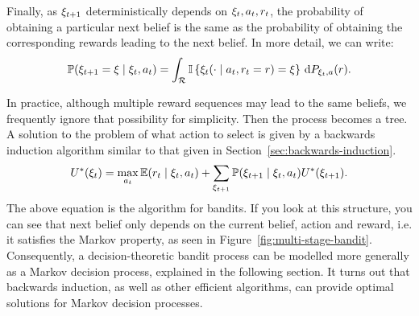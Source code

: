 \begin{definition}
  Finally, as $\xi_{t+1}$ deterministically depends on $\xi_t, a_t, r_t$, the probability of obtaining a particular next belief is the same as the probability of obtaining the corresponding rewards leading to the next belief. In more detail, we can write:
  \begin{equation}
    \label{eq:dt-bandit-belief-probability}
    \mathop{\mbox{\ensuremath{\mathbb{P}}}}\nolimits(\xi_{t+1} = \xi \mid \xi_t, a_t)
    =
    \int_{\mathcal{R}} \mathop{\mbox{\ensuremath{\mathbb{I}}}}\left\{\xi_{t}(\cdot \mid a_t, r_t = r) = \xi\right\} \,\mathrm{d}{P_{\xi_t, a}}(r). 
  \end{equation}
\end{definition}
In practice, although multiple reward sequences may lead to the same beliefs, we frequently ignore that possibility for simplicity. Then the process becomes a tree. A solution to the problem of what action to select is given by a backwards induction algorithm similar to that given in Section~\ref{sec:backwards-induction}.
\begin{equation}
  U^*(\xi_t) = \max_{a_t} \mathop{\mbox{\ensuremath{\mathbb{E}}}}\nolimits(r_t \mid \xi_t, a_t) + \sum_{\xi_{t+1}} \mathop{\mbox{\ensuremath{\mathbb{P}}}}\nolimits(\xi_{t+1} \mid \xi_t, a_t) U^*(\xi_{t+1}).\label{eq:backwards-induction-bandits}
\end{equation}
The above equation is the  algorithm for bandits.  If you look at this structure, you can see that  next belief only depends on the current belief, action and reward, i.e. it satisfies the Markov property, as seen in Figure~\ref{fig:multi-stage-bandit}. Consequently, a decision-theoretic bandit process can be modelled more generally as a Markov decision process, explained in the following section. It turns out that backwards induction, as well as other efficient algorithms, can provide optimal solutions for Markov decision processes.
